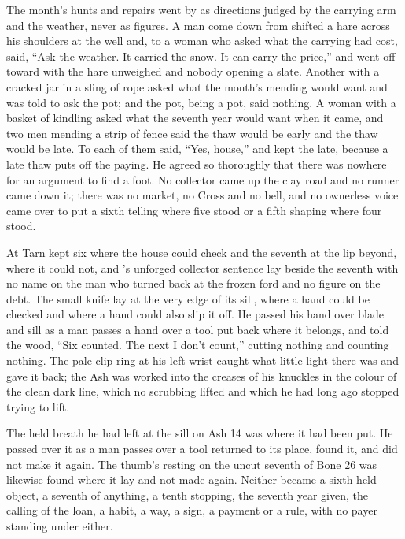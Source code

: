 The month's hunts and repairs went by as directions judged by the carrying arm and the weather, never as figures. A man come down from  shifted a hare across his shoulders at the well and, to a woman who asked what the carrying had cost, said, “Ask the weather. It carried the snow. It can carry the price,” and went off toward  with the hare unweighed and nobody opening a slate. Another with a cracked jar in a sling of rope asked what the month's mending would want and was told to ask the pot; and the pot, being a pot, said nothing. A woman with a basket of kindling asked what the seventh year would want when it came, and two men mending a strip of fence said the thaw would be early and the thaw would be late. To each of them  said, “Yes, house,” and kept the late, because a late thaw puts off the paying. He agreed so thoroughly that there was nowhere for an argument to find a foot. No collector came up the clay road and no runner came down it; there was no market, no Cross and no bell, and no ownerless voice came over  to put a sixth telling where five stood or a fifth shaping where four stood.

\scenebreak

At  Tarn kept six where the house could check and the seventh at the lip beyond, where it could not, and 's unforged collector sentence lay beside the seventh with no name on the man who turned back at the frozen ford and no figure on the debt. The small knife lay at the very edge of its sill, where a hand could be checked and where a hand could also slip it off. He passed his hand over blade and sill as a man passes a hand over a tool put back where it belongs, and told the wood, “Six counted. The next I don't count,” cutting nothing and counting nothing. The pale clip-ring at his left wrist caught what little light there was and gave it back; the Ash was worked into the creases of his knuckles in the colour of the clean dark line, which no scrubbing lifted and which he had long ago stopped trying to lift.

The held breath he had left at the sill on Ash 14 was where it had been put. He passed over it as a man passes over a tool returned to its place, found it, and did not make it again. The thumb's resting on the uncut seventh of Bone 26 was likewise found where it lay and not made again. Neither became a sixth held object, a seventh of anything, a tenth stopping, the seventh year given, the calling of the loan, a habit, a way, a sign, a payment or a rule, with no payer standing under either.

